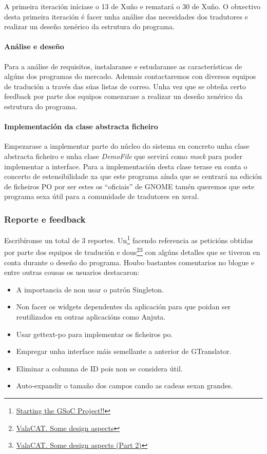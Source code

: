 A primeira iteración iníciase o 13 de Xuño e rematará o 30 de Xuño. O obxectivo desta primeira iteración é facer unha análise das necesidades dos tradutores e realizar un deseño xenérico da estrutura do programa.

\paragraph{Análise e deseño}
Para a análise de requisitos, instalaranse e estudaranse as características de algúns dos programas do mercado. Ademais contactaremos con diversos equipos de tradución a través das súas listas de correo. Unha vez que se obteña certo feedback por parte dos equipos comezarase a realizar un deseño xenérico da estrutura do programa.

\paragraph{Implementación da clase abstracta ficheiro}
Empezarase a implementar parte do núcleo do sistema en concreto unha clase abstracta ficheiro e unha clase \emph{DemoFile} que servirá como \emph{mock} para poder implementar a interface. Para a implementación desta clase terase en conta o concerto de estensibilidade xa que este programa aínda que se centrará na edición de ficheiros PO por ser estes os ``oficiais'' de GNOME tamén queremos que este programa sexa útil para a comunidade de tradutores en xeral.

\subsubsection{Reporte e feedback}
Escribíronse un total de 3 reportes. Un\footnote{\href{http://aquelando.info/startinggsocprojec/}{Starting the GSoC Project!!}} facendo referencia as peticións obtidas por parte dos equipos de tradución e dous\footnote{\href{http://aquelando.info/valacat-some-design-aspects/}{ValaCAT. Some design aspects}}\footnote{\href{http://aquelando.info/valacat-some-design-aspects-part-2/}{ValaCAT. Some design aspects (Part 2)}} con algúns detalles que se tiveron en conta durante o deseño do programa. Houbo bastantes comentarios no blogue e entre outras cousas os usuarios destacaron:

\begin{itemize}
  \item A importancia de non usar o patrón Singleton.
  \item Non facer os widgets dependentes da aplicación para que poidan ser reutilizados en outras aplicacións como Anjuta.
  \item Usar gettext-po para implementar os ficheiros po.
  \item Empregar unha interface máis semellante a anterior de GTranslator.
  \item Eliminar a columna de ID pois non se considera útil.
  \item Auto-expandir o tamaño dos campos cando as cadeas sexan grandes.
\end{itemize}

